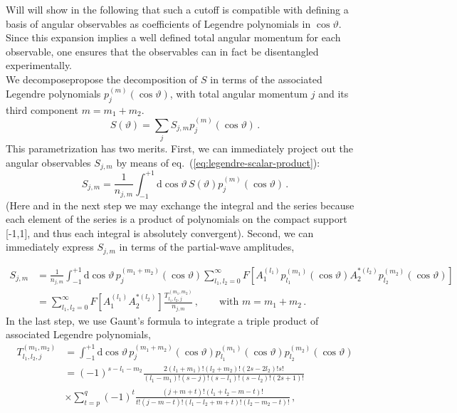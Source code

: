 \documentclass[aps,nofootinbib,preprintnumbers,prd,twocolumn]{revtex4-1}
\newcommand{\refeq}[1]{eq.~(\ref{eq:#1})}
\newcommand{\rmdx}[1]{\mbox{d} #1 \,} %
\renewcommand{\theta}{\vartheta}
\newcommand{\add}[1]{\textcolor{green!85!black}{#1}}
\newcommand{\del}[1]{\textcolor{red!85!black}{#1}}
\begin{document}
Will will show in the following that such a cutoff is compatible with defining a basis of angular
observables as coefficients of Legendre polynomials in $\cos\theta$. Since this expansion implies
a well defined total angular momentum for each observable, one ensures that the observables can in
fact be disentangled experimentally.\\

We \add{decompose}\del{propose the decomposition of} $S$ in terms of the associated Legendre polynomials $p_{j}^{(m)}(\cos\theta)$,
with total angular momentum $j$ and its third component $m=m_1 + m_2$.
\begin{equation}
    S(\theta) = \sum_j S_{j,m} p_{j}^{(m)}(\cos\theta)\,.
\end{equation}
This parametrization has two merits. First, we can immediately project out the angular observables $S_{j,m}$ by means of \refeq{legendre-scalar-product}:
\begin{equation}
    S_{j,m} = \frac{1}{n_{j,m}} \int_{-1}^{+1} \rmdx{\cos\theta} S(\theta) p_{j}^{(m)}(\cos\theta)\,.
\end{equation}
(Here and in the next step we may exchange the integral and the
series because each element of the series is a product of
polynomials on the compact support [-1,1], and thus each integral
is absolutely convergent).
Second, we can immediately express $S_{j,m}$ in terms of
the partial-wave amplitudes,
\begin{widetext}
\begin{equation}
    \label{eq:partial-wave-observable-infinite}
    \begin{aligned}
        S_{j,m}
            & = \frac{1}{n_{j,m}} \int_{-1}^{+1} \rmdx{\cos\theta} p_{j}^{(m_1 + m_2)}(\cos\theta) \sum_{l_1,l_2=0}^\infty F\left[A_{1}^{(l_1)} p_{l_1}^{(m_1)}(\cos\theta) A_{2}^{*(l_2)}p_{l_2}^{(m_2)}(\cos\theta)\right]\\
            & = \sum_{l_1,l_2=0}^\infty F\left[A_{1}^{(l_1)} A_{2}^{*(l_2)}\right] \frac{T_{l_1,l_2,j}^{(m_1,m_2)}}{n_{j,m}}\,,\qquad\text{with }m = m_1 + m_2\,.
    \end{aligned}
\end{equation}
In the last step, we use Gaunt's formula \cite{Gaunt:1929} to integrate a triple product of associated Legendre polynomials,
\begin{equation}
\begin{aligned}
    T_{l_1,l_2,j}^{(m_1,m_2)}
        & = \int_{-1}^{+1} \rmdx{\cos\theta} p_{j}^{(m_1 + m_2)}(\cos\theta) p_{l_1}^{(m_1)}(\cos\theta) p_{l_2}^{(m_2)}(\cos\theta)\\
        & = (-1)^{s - l_1 - m_2} \frac{2 (l_1 + m_1)! (l_2 + m_2)! (2s - 2 l_2)! s!}{(l_1 - m_1)! (s - j)! (s - l_1)! (s - l_2)! (2s + 1)!}\\
        & \times \sum_{t=p}^q (-1)^t \frac{(j + m + t)!(l_1 + l_2 - m - t)!}{t! (j - m - t)! (l_1 - l_2 + m + t)! (l_2 - m_2 - t)!}\,,
\end{aligned}
\end{equation}
\end{widetext}
\end{document}
